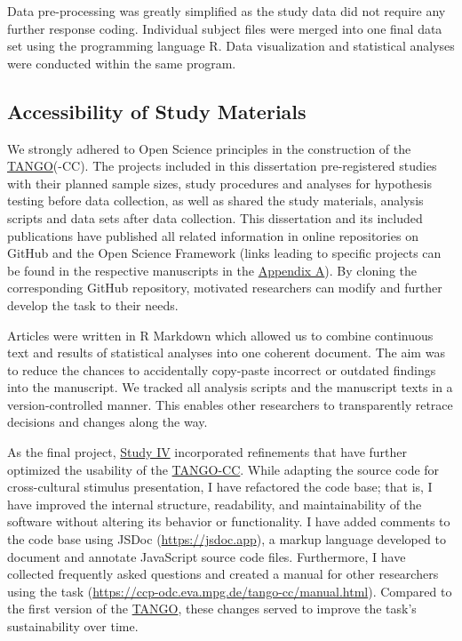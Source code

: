 \documentclass[
]{scrbook}
\begin{document}
Data pre-processing was greatly simplified as the study data did not require any further response coding. Individual subject files were merged into one final data set using the programming language R. Data visualization and statistical analyses were conducted within the same program.

\subsection{Accessibility of Study Materials}\label{approach-accessibility}

We strongly adhered to Open Science principles in the construction of the \hyperref[acronyms_TANGO]{TANGO}(-CC). The projects included in this dissertation pre-registered studies with their planned sample sizes, study procedures and analyses for hypothesis testing before data collection, as well as shared the study materials, analysis scripts and data sets after data collection. This dissertation and its included publications have published all related information in online repositories on GitHub and the Open Science Framework (links leading to specific projects can be found in the respective manuscripts in the \hyperref[appendixA]{Appendix A}). By cloning the corresponding GitHub repository, motivated researchers can modify and further develop the task to their needs.

Articles were written in R Markdown which allowed us to combine continuous text and results of statistical analyses into one coherent document. The aim was to reduce the chances to accidentally copy-paste incorrect or outdated findings into the manuscript. We tracked all analysis scripts and the manuscript texts in a version-controlled manner. This enables other researchers to transparently retrace decisions and changes along the way.

As the final project, \hyperref[studyIV]{Study IV} incorporated refinements that have further optimized the usability of the \hyperref[acronyms_TANGO-CC]{TANGO-CC}. While adapting the source code for cross-cultural stimulus presentation, I have refactored the code base; that is, I have improved the internal structure, readability, and maintainability of the software without altering its behavior or functionality. I have added comments to the code base using JSDoc (\mbox{\url{https://jsdoc.app}}), a markup language developed to document and annotate JavaScript source code files. Furthermore, I have collected frequently asked questions and created a manual for other researchers using the task (\mbox{\url{https://ccp-odc.eva.mpg.de/tango-cc/manual.html}}). Compared to the first version of the \hyperref[acronyms_TANGO]{TANGO}, these changes served to improve the task's sustainability over time.
\end{document}
